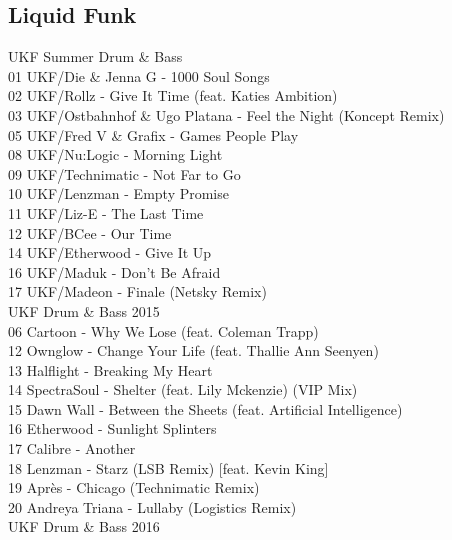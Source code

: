 \begin{multicols}{2}
 \subsection*{Liquid Funk}
 \large UKF Summer Drum \& Bass \normalsize\\
 01 UKF/Die \& Jenna G - 1000 Soul Songs\\ 02 UKF/Rollz - Give It Time (feat. Katies Ambition)\\ 03 UKF/Ostbahnhof \& Ugo Platana - Feel the Night (Koncept Remix)\\ 05 UKF/Fred V \& Grafix - Games People Play\\ 08 UKF/Nu:Logic - Morning Light\\ 09 UKF/Technimatic - Not Far to Go\\ 10 UKF/Lenzman - Empty Promise\\ 11 UKF/Liz-E - The Last Time\\ 12 UKF/BCee - Our Time\\ 14 UKF/Etherwood - Give It Up\\ 16 UKF/Maduk - Don't Be Afraid\\ 17 UKF/Madeon - Finale (Netsky Remix)\\
 \large UKF Drum \& Bass 2015 \normalsize\\
 06 Cartoon - Why We Lose (feat. Coleman Trapp)\\ 12 Ownglow - Change Your Life (feat. Thallie Ann Seenyen)\\ 13 Halflight - Breaking My Heart\\ 14 SpectraSoul - Shelter (feat. Lily Mckenzie) (VIP Mix) \\ 15 Dawn Wall - Between the Sheets (feat. Artificial Intelligence)\\ 16 Etherwood - Sunlight Splinters\\ 17 Calibre - Another\\ 18 Lenzman - Starz (LSB Remix) [feat. Kevin King]\\ 19 Après - Chicago (Technimatic Remix)\\ 20 Andreya Triana - Lullaby (Logistics Remix)\\
 \large UKF Drum \& Bass 2016 \normalsize\\

\end{multicols}
